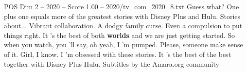 \begin{textsample}{POS Dim 2 – 2020 – Score 1.00 – 2020/tv\_com\_2020\_8.txt}  \label{ex:f2_pos_074}
Guess what?
One plus one equals more of the greatest stories with Disney Plus and Hulu.
Stories about...
Vibrant collaboration.
A dodgy family curse.
Even a compulsion to put things right.
It 's the best of both \textbf{worlds} and we are just getting started.
So when you watch, you 'll say, oh yeah, I 'm pumped.
Please, someone make sense of it.
Girl, I know.
I 'm obsessed with these stories.
It 's the best of the best together with Disney Plus Hulu.
Subtitles by the Amara.org community

\end{textsample}
